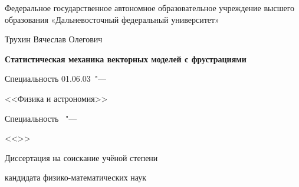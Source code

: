 \thispagestyle{empty}
\begin{center}
	Федеральное государственное автономное образовательное учреждение высшего образования «Дальневосточный федеральный университет»
\end{center}
%
\vspace{0pt plus4fill} %
%
\vspace{0pt plus6fill} %
\begin{center}
	{\large Трухин Вячеслав Олегович}
\end{center}
%
\vspace{0pt plus1fill} %
\begin{center}
	\textbf {\large %
		Статистическая механика векторных моделей с фрустрациями}
	
	\vspace{0pt plus2fill} %
	{%
		Специальность 01.06.03\ "---
		
		<<Физика и астрономия>>
	}
	
	\ifdefined\thesisSpecialtyTwoNumber
	{%
		Специальность \thesisSpecialtyTwoNumber\ "---
		
		<<\thesisSpecialtyTwoTitle>>
	}
	\fi
	
	\vspace{0pt plus2fill} %
	Диссертация на соискание учёной степени
	
	кандидата физико-математических наук
\end{center}
